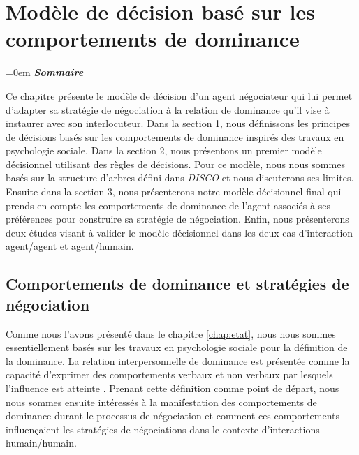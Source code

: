 \chapter{Modèle de décision basé sur les comportements de dominance}
	\label{chap:dec}
	
	\begingroup
	\parindent=0em
	\emph{\textbf{Sommaire}}
	\localtableofcontents 
	\clearpage
	\endgroup
	
	Ce chapitre présente le modèle de décision d'un agent négociateur qui lui permet d'adapter sa stratégie de négociation à la relation de dominance qu'il vise à instaurer avec son interlocuteur. Dans la section 1, nous définissons les principes de décisions basés sur les comportements de dominance inspirés des travaux en psychologie sociale. Dans la section 2, nous présentons un premier modèle décisionnel utilisant des règles de décisions.  Pour ce modèle, nous nous sommes basés sur la structure d'arbres défini dans \emph{DISCO} \cite{rich09} et nous discuterons ses limites. Ensuite dans la section 3, nous présenterons notre modèle décisionnel final qui prends en compte les comportements de dominance de l'agent associés à ses préférences pour construire sa stratégie de négociation. Enfin, nous présenterons deux études visant à valider le modèle décisionnel dans les deux cas d'interaction agent/agent et agent/humain.
	
	\section{Comportements de dominance et stratégies de négociation}
	\label{chap:domer}
	Comme nous l'avons présenté dans le chapitre \ref{chap:etat}, nous nous sommes essentiellement basés sur les travaux en psychologie sociale pour la définition de la dominance. 
	La relation interpersonnelle de dominance est présentée comme la capacité d'exprimer des comportements verbaux et non verbaux par lesquels l'influence est atteinte \cite{burgoon2006nonverbal}. Prenant cette définition comme point de départ, nous nous sommes ensuite intéressés à la manifestation des comportements de dominance durant le processus de négociation et comment ces comportements influençaient les stratégies de négociations dans le contexte d'interactions humain/humain. 
	
